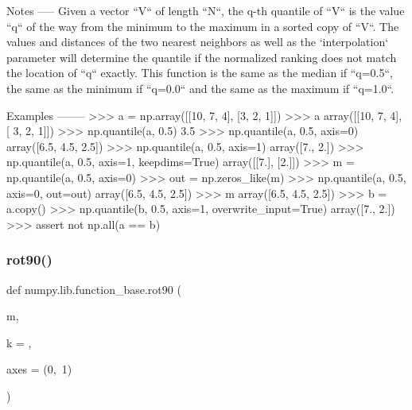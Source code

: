 \begin{DoxyVerb}
Notes
-----
Given a vector ``V`` of length ``N``, the q-th quantile of
``V`` is the value ``q`` of the way from the minimum to the
maximum in a sorted copy of ``V``. The values and distances of
the two nearest neighbors as well as the `interpolation` parameter
will determine the quantile if the normalized ranking does not
match the location of ``q`` exactly. This function is the same as
the median if ``q=0.5``, the same as the minimum if ``q=0.0`` and the
same as the maximum if ``q=1.0``.

Examples
--------
>>> a = np.array([[10, 7, 4], [3, 2, 1]])
>>> a
array([[10,  7,  4],
       [ 3,  2,  1]])
>>> np.quantile(a, 0.5)
3.5
>>> np.quantile(a, 0.5, axis=0)
array([6.5, 4.5, 2.5])
>>> np.quantile(a, 0.5, axis=1)
array([7.,  2.])
>>> np.quantile(a, 0.5, axis=1, keepdims=True)
array([[7.],
       [2.]])
>>> m = np.quantile(a, 0.5, axis=0)
>>> out = np.zeros_like(m)
>>> np.quantile(a, 0.5, axis=0, out=out)
array([6.5, 4.5, 2.5])
>>> m
array([6.5, 4.5, 2.5])
>>> b = a.copy()
>>> np.quantile(b, 0.5, axis=1, overwrite_input=True)
array([7.,  2.])
>>> assert not np.all(a == b)
\end{DoxyVerb}
 \mbox{\label{namespacenumpy_1_1lib_1_1function__base_ae7e26dce00db8f70ff62cbe0502a9d32}} 
\subsubsection{\texorpdfstring{rot90()}{rot90()}}
{\footnotesize\ttfamily def numpy.\+lib.\+function\+\_\+base.\+rot90 (\begin{DoxyParamCaption}\item[{}]{m,  }\item[{}]{k = {},  }\item[{}]{axes = {\ttfamily (0,~1)} }\end{DoxyParamCaption})}

